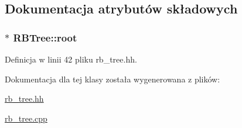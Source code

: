 \subsection{Dokumentacja atrybutów składowych}
\hypertarget{class_r_b_tree_a259103b092340c5b64aabff1d9bc644c}{
\subsubsection[{root}]{$\ast$ R\-B\-Tree\-::root\hspace{0.3cm}{\ttfamily [private]}}}\label{class_r_b_tree_a259103b092340c5b64aabff1d9bc644c}


Definicja w linii 42 pliku rb\-\_\-tree.\-hh.



Dokumentacja dla tej klasy została wygenerowana z plików\-:\begin{DoxyCompactItemize}
\item 
\hyperlink{rb__tree_8hh}{rb\-\_\-tree.\-hh}\item 
\hyperlink{rb__tree_8cpp}{rb\-\_\-tree.\-cpp}\end{DoxyCompactItemize}
